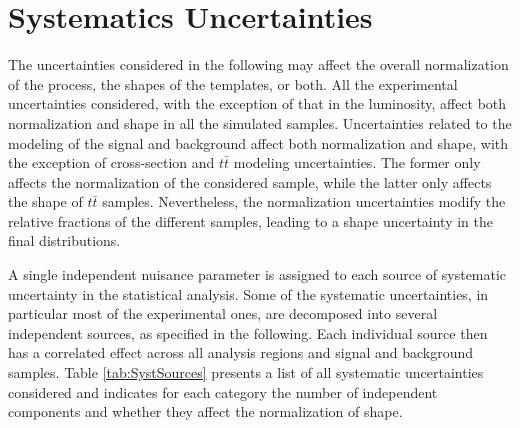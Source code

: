 \section{Systematics Uncertainties}
\label{sec:SystUncert}

The uncertainties considered in the following may affect the overall normalization of the process, the shapes of the templates, or both. All the experimental uncertainties considered, with the exception of that in the luminosity, affect both normalization and shape in all the simulated samples. Uncertainties related to the modeling of the signal and background affect both normalization and shape, with the exception of cross-section and $t\bar{t}$ modeling uncertainties. The former only affects the normalization of the considered sample, while the latter only affects the shape of $t\bar{t}$ samples. Nevertheless, the normalization uncertainties modify the relative fractions of the different samples, leading to a shape uncertainty in the final distributions.

A single independent nuisance parameter is assigned to each source of systematic uncertainty in the statistical analysis. Some of the systematic uncertainties, in particular most of the experimental ones, are decomposed into several independent sources, as specified in the following. Each individual source then has a correlated effect across all analysis regions and signal and background samples. Table \ref{tab:SystSources} presents a list of all systematic uncertainties considered and indicates for each category the number of independent components and whether they affect the normalization of shape.

